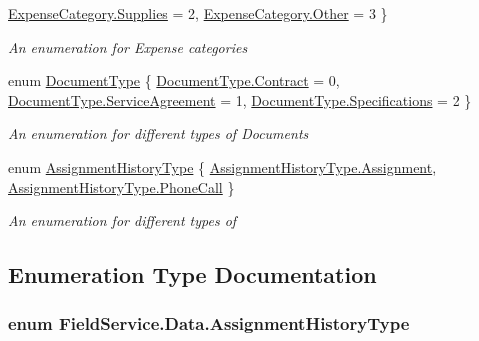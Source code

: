 \begin{DoxyCompactItemize}
\hyperlink{namespace_field_service_1_1_data_a6565a839d23a4c941ba4a771c1e22163a4fe81faeb707a537f2d4318aee43f241}{Expense\+Category.\+Supplies} = 2, 
\hyperlink{namespace_field_service_1_1_data_a6565a839d23a4c941ba4a771c1e22163a6311ae17c1ee52b36e68aaf4ad066387}{Expense\+Category.\+Other} = 3
 \}
\begin{DoxyCompactList}\small\item\em An enumeration for Expense categories \end{DoxyCompactList}\item 
enum \hyperlink{namespace_field_service_1_1_data_a3f59e9016ae4f76b12fee13c8594ca72}{Document\+Type} \{ \hyperlink{namespace_field_service_1_1_data_a3f59e9016ae4f76b12fee13c8594ca72af49498143b94e78415d06029763412b9}{Document\+Type.\+Contract} = 0, 
\hyperlink{namespace_field_service_1_1_data_a3f59e9016ae4f76b12fee13c8594ca72ae2faf90818994741cfebee72269afb8f}{Document\+Type.\+Service\+Agreement} = 1, 
\hyperlink{namespace_field_service_1_1_data_a3f59e9016ae4f76b12fee13c8594ca72ab36d2184563e1bcc51472085da9e4a72}{Document\+Type.\+Specifications} = 2
 \}
\begin{DoxyCompactList}\small\item\em An enumeration for different types of Documents \end{DoxyCompactList}\item 
enum \hyperlink{namespace_field_service_1_1_data_adab81adc38635c82c27eb6518365aa95}{Assignment\+History\+Type} \{ \hyperlink{namespace_field_service_1_1_data_adab81adc38635c82c27eb6518365aa95af3b92fc0f97f128818cfb44321376bca}{Assignment\+History\+Type.\+Assignment}, 
\hyperlink{namespace_field_service_1_1_data_adab81adc38635c82c27eb6518365aa95a4936f47a195c357f6fb0045499a229c6}{Assignment\+History\+Type.\+Phone\+Call}
 \}
\begin{DoxyCompactList}\small\item\em An enumeration for different types of \end{DoxyCompactList}\end{DoxyCompactItemize}


\subsection{Enumeration Type Documentation}
\hypertarget{namespace_field_service_1_1_data_adab81adc38635c82c27eb6518365aa95}{
\subsubsection[{Assignment\+History\+Type}]{\setlength{\rightskip}{0pt plus 5cm}enum {\bf Field\+Service.\+Data.\+Assignment\+History\+Type}}}\label{namespace_field_service_1_1_data_adab81adc38635c82c27eb6518365aa95}


